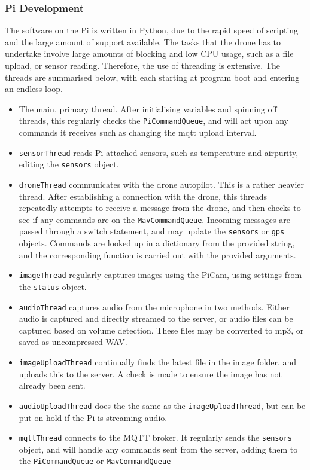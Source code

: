 \documentclass{article}
\begin{document}
\subsubsection{Pi Development}
The software on the Pi is written in Python, due to the rapid speed of scripting and the large amount of support available. The tasks that the drone has to undertake involve large amounts of blocking and low CPU usage, such as a file upload, or sensor reading. Therefore, the use of threading is extensive. The threads are summarised below, with each starting at program boot and entering an endless loop. 
\begin{itemize}
	\item The main, primary thread. After initialising variables and spinning off threads, this regularly checks the \texttt{PiCommandQueue}, and will act upon any commands it receives such as changing the mqtt upload interval.
	\item \texttt{sensorThread} reads Pi attached sensors, such as temperature and airpurity, editing the \texttt{sensors} object.
	\item \texttt{droneThread} communicates with the drone autopilot. This is a rather heavier thread. After establishing a connection with the drone, this threads repeatedly attempts to receive a message from the drone, and then checks to see if any commands are on the \texttt{MavCommandQueue}. Incoming messages are passed through a switch statement, and may update the \texttt{sensors} or \texttt{gps} objects. Commands are looked up in a dictionary from the provided string, and the corresponding function is carried out with the provided arguments. 
	\item \texttt{imageThread} regularly captures images using the PiCam, using settings from the \texttt{status} object.
	\item \texttt{audioThread} captures audio from the microphone in two methods. Either audio is captured and directly streamed to the server, or audio files can be captured based on volume detection. These files may be converted to mp3, or saved as uncompressed WAV.
	\item \texttt{imageUploadThread} continually finds the latest file in the image folder, and uploads this to the server. A check is made to ensure the image has not already been sent.
	\item \texttt{audioUploadThread} does the the same as the \texttt{imageUploadThread}, but can be put on hold if the Pi is streaming audio.
	\item \texttt{mqttThread} connects to the MQTT broker. It regularly sends the \texttt{sensors} object, and will handle any commands sent from the server, adding them to the \texttt{PiCommandQueue} or \texttt{MavCommandQueue}
\end{itemize}
\end{document}
